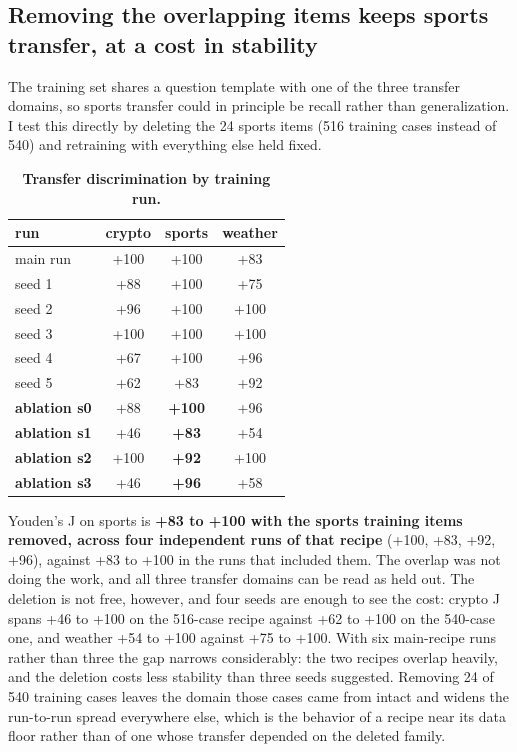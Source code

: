 \documentclass[10pt]{article}
\newcommand{\tablefont}{\fontsize{8.7pt}{11.5pt}\selectfont}
\begin{document}
\subsection{Removing the overlapping items keeps sports transfer, at a cost in stability}

The training set shares a question template with one of the three transfer domains, so sports transfer could in principle be recall rather than generalization. I test this directly by deleting the 24 sports items (516 training cases instead of 540) and retraining with everything else held fixed.

\begin{table}[!htbp]
\centering
\tablefont
\caption{\textbf{Transfer discrimination by training run.}}
\begin{tabular}{|l|c|c|c|}
\hline
\rowcolor{tblhead}\textbf{run} & \textbf{crypto} & \textbf{sports} & \textbf{weather} \\
\hline
main run & +100 & +100 & +83 \\
\hline
seed 1 & +88 & +100 & +75 \\
\hline
seed 2 & +96 & +100 & +100 \\
\hline
seed 3 & +100 & +100 & +100 \\
\hline
seed 4 & +67 & +100 & +96 \\
\hline
seed 5 & +62 & +83 & +92 \\
\hline
\textbf{ablation s0} & +88 & \textbf{+100} & +96 \\
\hline
\textbf{ablation s1} & +46 & \textbf{+83} & +54 \\
\hline
\textbf{ablation s2} & +100 & \textbf{+92} & +100 \\
\hline
\textbf{ablation s3} & +46 & \textbf{+96} & +58 \\
\hline
\end{tabular}
\end{table}

Youden's J on sports is \textbf{+83 to +100 with the sports training items removed, across four independent runs of that recipe} (+100, +83, +92, +96), against +83 to +100 in the runs that included them. The overlap was not doing the work, and all three transfer domains can be read as held out. The deletion is not free, however, and four seeds are enough to see the cost: crypto J spans +46 to +100 on the 516-case recipe against +62 to +100 on the 540-case one, and weather +54 to +100 against +75 to +100. With six main-recipe runs rather than three the gap narrows considerably: the two recipes overlap heavily, and the deletion costs less stability than three seeds suggested. Removing 24 of 540 training cases leaves the domain those cases came from intact and widens the run-to-run spread everywhere else, which is the behavior of a recipe near its data floor rather than of one whose transfer depended on the deleted family.
\end{document}
